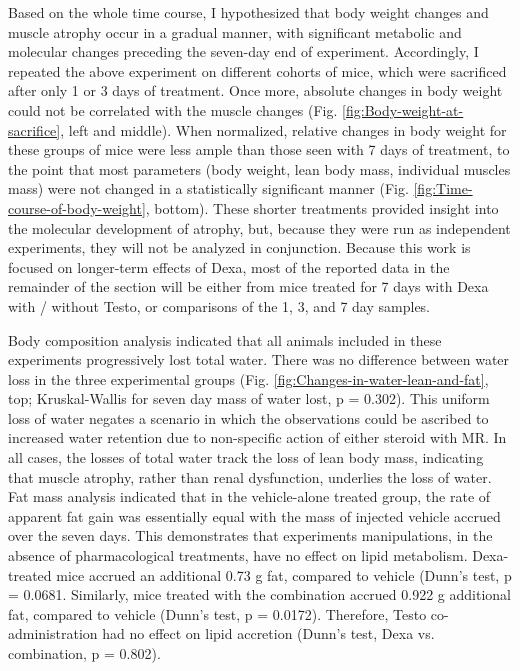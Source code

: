 \documentclass[12pt,english]{report}\usepackage[]{graphicx}\usepackage[]{color}
\begin{document}
Based on the whole time course, I hypothesized that body weight changes
and muscle atrophy occur in a gradual manner, with significant metabolic
and molecular changes preceding the seven-day end of experiment. Accordingly,
I repeated the above experiment on different cohorts of mice, which
were sacrificed after only 1 or 3 days of treatment. Once more, absolute
changes in body weight could not be correlated with the muscle changes
(Fig. \ref{fig:Body-weight-at-sacrifice}, left and middle). When
normalized, relative changes in body weight for these groups of mice
were less ample than those seen with 7 days of treatment, to the point
that most parameters (body weight, lean body mass, individual muscles
mass) were not changed in a statistically significant manner (Fig.
\ref{fig:Time-course-of-body-weight}, bottom). These shorter treatments
provided insight into the molecular development of atrophy, but, because
they were run as independent experiments, they will not be analyzed
in conjunction. Because this work is focused on longer-term effects
of Dexa, most of the reported data in the remainder of the section
will be either from mice treated for 7 days with Dexa with / without
Testo, or comparisons of the 1, 3, and 7 day samples.

Body composition analysis indicated that all animals included in these
experiments progressively lost total water. There was no difference
between water loss in the three experimental groups (Fig. \ref{fig:Changes-in-water-lean-and-fat},
top; Kruskal-Wallis for seven day mass of water lost, p = 0.302).
This uniform loss of water negates a scenario in which the observations
could be ascribed to increased water retention due to non-specific
action of either steroid with MR. In all cases, the losses of total
water track the loss of lean body mass, indicating that muscle atrophy,
rather than renal dysfunction, underlies the loss of water. Fat mass
analysis indicated that in the vehicle-alone treated group, the rate
of apparent fat gain was essentially equal with the mass of injected
vehicle accrued over the seven days. This demonstrates that experiments
manipulations, in the absence of pharmacological treatments, have
no effect on lipid metabolism. Dexa-treated mice accrued an additional
0.73
g fat, compared to vehicle (Dunn's test, p = 0.0681.
Similarly, mice treated with the combination accrued 0.922
g additional fat, compared to vehicle (Dunn's test, p = 0.0172).
Therefore, Testo co-administration had no effect on lipid accretion
(Dunn's test, Dexa vs. combination, p = 0.802).
\end{document}
